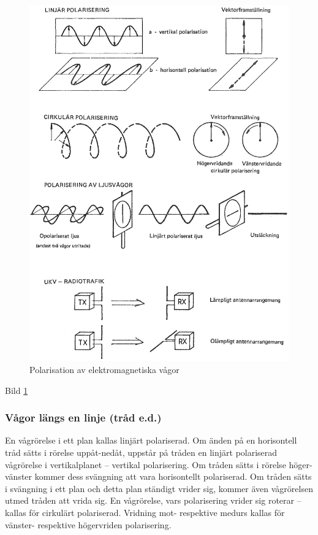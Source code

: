 \begin{figure}
  \includegraphics[width=\textwidth]{images/cropped_pdfs/bild_2_1-14.pdf}
  \caption{Polarisation av elektromagnetiska vågor}
  \label{fig:BildII1-14}
\end{figure}

Bild \ref{fig:BildII1-14}

\subsubsection{Vågor längs en linje (tråd e.d.)}
En vågrörelse i ett plan kallas linjärt polariserad. Om änden på en horisontell
tråd sätts i rörelse uppåt-nedåt, uppstår på tråden en linjärt polariserad
vågrörelse i vertikalplanet -- vertikal polarisering.
Om tråden sätts i rörelse höger-vänster kommer dess svängning att vara
horisontellt polariserad.
Om tråden sätts i svängning i ett plan och detta plan ständigt vrider sig,
kommer även vågrörelsen utmed tråden att vrida sig. En vågrörelse, vars
polarisering vrider sig roterar -- kallas för cirkulärt polariserad. Vridning
mot- respektive medurs kallas för vänster- respektive högervriden polarisering.

